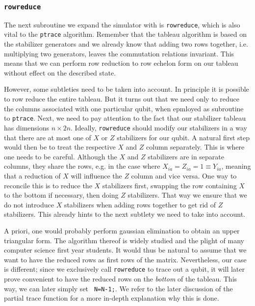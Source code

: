 \subsubsection{\texttt{rowreduce}}
The next subroutine we expand the simulator with is \texttt{rowreduce}, which
is also vital to the \verb|ptrace| algorithm. Remember that the tableau
algorithm is based on the stabilizer generators and we already know that adding
two rows together, i.e. multiplying two generators, leaves the commutation
relations invariant. This means that we can perform row reduction to row
echelon form on our tableau without effect on the described state.

However,
some subtleties need to be taken into account. In principle it is possible to
row reduce the entire tableau. But it turns out that we need only to reduce the
columns associated with one particular qubit, when epmloyed as subroutine to
\verb|ptrace|. Next, we need to pay attention to the fact that our stabilizer
tableau has dimensions $n\times 2n$. Ideally, \verb|rowreduce| should modify
our stabilizers in a way that there are at most one of $X$ or $Z$ stabilizers
for our qubit. A natural first step would then be to treat the respective $X$
and $Z$ column separately. This is where one needs to be careful. Although the $X$
and $Z$ stabilizers are in separate columns, they share the rows, e.g. in the
case where $X_{ia}=Z_{ia}=1\equiv Y_{ia}$, meaning that
a reduction of $X$ will influence the $Z$ column and vice versa. One way to
reconcile this is to reduce the $X$ stabilizers first, swapping the row
containing $X$ to the bottom if necessary, then doing $Z$ stabilizers. That way
we ensure that we do not introduce $X$ stabilizers when adding rows together
to get rid of $Z$ stabilizers. This already hints to the next subtlety we need
to take into account.

A priori, one would probably perform gaussian
elimination to obtain an upper triangular form. The algorithm thereof is widely
studied and the plight of many computer science first year students. It would
thus be natural to assume that we want to have the reduced rows as first rows
of the matrix. Nevertheless, our case is different; since we exclusively call
\verb|rowreduce| to trace out a qubit, it will later prove convenient to have
the reduced rows on the \emph{bottom} of the tableau. This way, we can later
simply set \verb| N=N-1;|. We refer to the later discussion of the partial
trace function for a more in-depth explanation why this is done.

